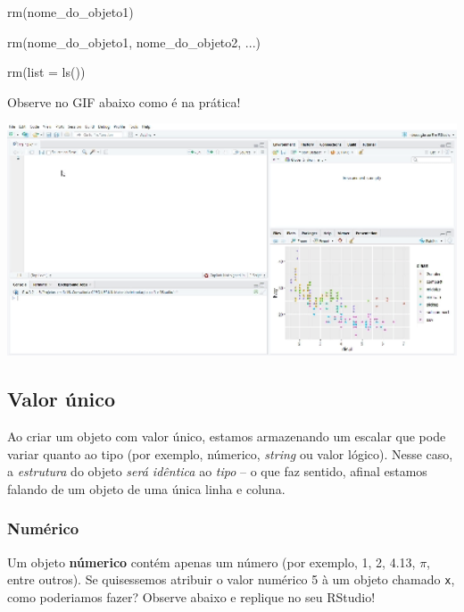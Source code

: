 \documentclass[
  letterpaper,
  DIV=11,
  numbers=noendperiod]{scrreprt}
\newenvironment{Shaded}{\begin{snugshade}}{\end{snugshade}}
\newcommand{\AttributeTok}[1]{\textcolor[rgb]{0.40,0.45,0.13}{#1}}
\newcommand{\FunctionTok}[1]{\textcolor[rgb]{0.28,0.35,0.67}{#1}}
\newcommand{\NormalTok}[1]{\textcolor[rgb]{0.00,0.23,0.31}{#1}}
\begin{document}
\begin{Shaded}
\begin{Highlighting}[]
\FunctionTok{rm}\NormalTok{(nome\_do\_objeto1)}

\FunctionTok{rm}\NormalTok{(nome\_do\_objeto1, nome\_do\_objeto2, ...)}

\FunctionTok{rm}\NormalTok{(}\AttributeTok{list =} \FunctionTok{ls}\NormalTok{())}
\end{Highlighting}
\end{Shaded}

Observe no GIF abaixo como é na prática!

\begin{center}
\includegraphics[width=6.45833in,height=\textheight]{images/criando_objeto.gif}
\end{center}

\subsection{Valor único}\label{valor-uxfanico}

Ao criar um objeto com valor único, estamos armazenando um escalar que
pode variar quanto ao tipo (por exemplo, númerico, \emph{string} ou
valor lógico). Nesse caso, a \emph{estrutura} do objeto \emph{será
idêntica} ao \emph{tipo} -- o que faz sentido, afinal estamos falando de
um objeto de uma única linha e coluna.

\subsubsection{Numérico}\label{numuxe9rico}

Um objeto \textbf{númerico} contém apenas um número (por exemplo, 1, 2,
4.13, \(\pi\), entre outros). Se quisessemos atribuir o valor numérico 5
à um objeto chamado \texttt{x}, como poderiamos fazer? Observe abaixo e
replique no seu RStudio!
\end{document}
